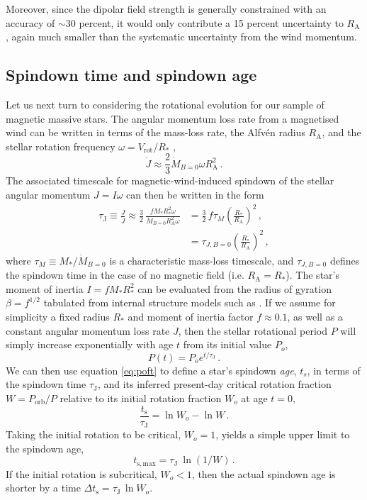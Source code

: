\documentclass[useAMS,usenatbib]{mn2e}
\newcommand{\ra}{R_\mathrm{A}}
\newcommand{\rs}{R_\ast}
\newcommand{\ms}{M_\ast}
\newcommand{\vrot}{V_\mathrm{rot}}
\newcommand{\mdot}{\dot{M}_{B=0}}
\newcommand{\tauj}{\tau_\mathrm{J}}
\newcommand{\tsmax}{t_{\mathrm{s,max}}}
\newcommand{\ts}{t_\mathrm{s}}
\newcommand{\beqn}{\begin{equation}}
\newcommand{\eeqn}{\end{equation}}
\begin{document}
 Moreover, since the dipolar field strength is generally constrained with an accuracy of $\sim30$ percent, it would only contribute a 15 percent  uncertainty to $\ra$, again much smaller than the systematic uncertainty from the wind momentum. 

  



\subsection{Spindown time and spindown age}
\label{sec:spindown}


Let us next turn to considering the rotational evolution for our sample of magnetic massive stars.
The angular momentum loss rate from a magnetised wind can be written in terms of the mass-loss rate, the Alfv\'{e}n radius $\ra$, and the stellar rotation frequency $\omega = \vrot/\rs$ \citep{1967ApJ...148..217W,2009MNRAS.392.1022U},
\beqn
{\dot J} \approx \frac{2}{3} \mdot \omega \ra^2 \, .
\label{jdotdef}
\eeqn
The associated timescale for magnetic-wind-induced spindown of the stellar angular momentum $J = I \omega$ can then be written in the form
\begin{align}
\tauj \equiv \frac{J}{\dot J}  \approx \frac{3}{2} \, \frac{f \ms \rs^2 \omega}{\mdot \ra^2 \omega}
&= \frac{3}{2} \, f \tau_M  \left ( \frac{\rs}{\ra} \right )^2\, , \label{taujdef} \\
&= \tau_{J,B=0}  \left ( \frac{\rs}{\ra} \right )^2\, , \nonumber 
\end{align}
where $\tau_M \equiv \ms/\mdot$ is a characteristic mass-loss timescale,
and $\tau_{J,B=0}$ defines the spindown time in the case of no magnetic field (i.e. $\ra=\rs$).
The star's moment of inertia $I= f \ms \rs^2$ can be evaluated from the radius of gyration $\beta=f^{1/2}$ tabulated from internal structure models such as \citet{2004A&A...424..919C}.
If we assume for simplicity a fixed radius $\rs$ and moment of inertia factor $f \approx 0.1$, as well as a constant angular momentum loss rate ${\dot J}$, 
then the stellar rotational period $P$ will simply increase exponentially with age $t$ from its initial value $P_o$,
\beqn
P(t) = P_o e^{t/\tauj} \, .
\label{eq:poft}
\eeqn
We can then use equation \ref{eq:poft} to define a star's spindown \textit{age}, $t_s$, in terms of the spindown time $\tauj$, and its inferred present-day critical rotation fraction $W = P_\mathrm{orb}/P$ relative to its initial rotation fraction $W_o$ at age $t=0$,
\beqn
\frac{\ts}{\tauj} = \ln{W_o} - \ln{W}
\, .
\label{tstauj}
\eeqn
Taking the initial rotation to be critical, $W_o =1$, yields a simple upper limit to the spindown age,
\beqn
\tsmax = \tauj ~  \ln (1/W)
\, .
\label{tsmax}
\eeqn
If the initial rotation is subcritical, $W_o < 1$, then the actual spindown age is shorter by a time $\Delta \ts =  \tauj \, \ln W_o$.
\end{document}
